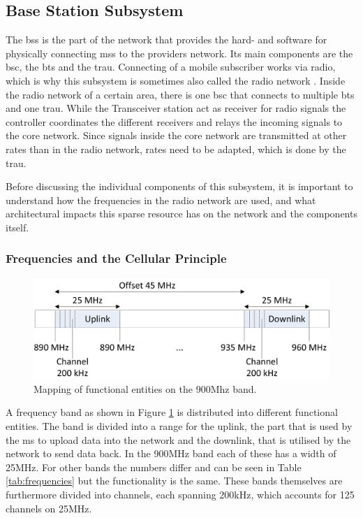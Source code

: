 \subsection{Base Station Subsystem}
\label{sec:bss}
The \gls{bss} is the part of the network that provides the hard- and software for physically connecting \glspl{ms} to the providers network.
Its main components are the \gls{bsc}, the \gls{bts} and the \gls{trau}.
Connecting of a mobile subscriber works via radio, which is why this subsystem is sometimes also called the radio network \cite{kommsys2006}.
Inside the radio network of a certain area, there is one \gls{bsc} that connects to multiple \gls{bts} and one \gls{trau}.
While the Transceiver station act as receiver for radio signals the controller coordinates the different receivers and relays the incoming signals  to the core network.
Since signals inside the core network are transmitted at other rates than in the radio network, rates need to be adapted, which is done by the \gls{trau}.

Before discussing the individual components of this subsystem, it is important to understand how the frequencies in the radio network are used, and what architectural impacts this sparse resource has on the network and the components itself.

\subsubsection{Frequencies and the Cellular Principle}
\begin{figure}
\centering
\includegraphics{../Images/Mapping}
\caption{Mapping of functional entities on the 900Mhz band.}
\label{fig:frequency}
\end{figure}

A frequency band as shown in Figure \ref{fig:frequency} is distributed into different functional entities.
The band is divided into a range for the uplink, the part that is used by the \gls{ms} to upload data into the network and the downlink, that is utilised by the network to send data back.
In the 900MHz band each of these has a width of 25MHz.
For other bands the numbers differ and can be seen in Table \ref{tab:frequencies} but the functionality is the same.
These bands themselves are furthermore divided into channels, each spanning 200kHz, which accounts for 125 channels on 25MHz.

